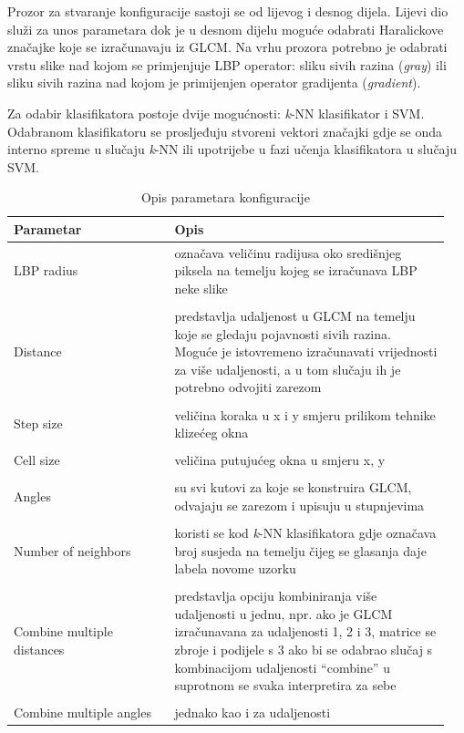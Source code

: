 \documentclass[times, utf8, zavrsni]{fer}
\begin{document}
\bigbreak

Prozor za stvaranje konfiguracije sastoji se od lijevog i desnog dijela. 
Lijevi dio služi za unos parametara dok je u desnom dijelu moguće odabrati
Haralickove značajke koje se izračunavaju iz GLCM. Na vrhu prozora potrebno
je odabrati vrstu slike nad kojom se primjenjuje LBP operator: sliku 
sivih razina (\textit{gray}) ili sliku sivih razina nad kojom je 
primijenjen operator gradijenta (\textit{gradient}). 

\bigbreak

Za odabir klasifikatora postoje dvije mogućnosti: \textit{k}-NN klasifikator i 
SVM. Odabranom klasifikatoru se prosljeđuju stvoreni vektori značajki gdje se onda
interno spreme u slučaju \textit{k}-NN ili upotrijebe u fazi učenja klasifikatora
u slučaju SVM. 

\begin{table}
\begin{tabular}{p{0.35\linewidth} | p{0.6\linewidth}}
Parametar & Opis \\
\hline
LBP radius & označava veličinu radijusa oko središnjeg piksela
na temelju kojeg se izračunava LBP neke slike \\

\\
\hline
Distance & predstavlja udaljenost u GLCM na temelju koje 
se gledaju pojavnosti sivih razina. Moguće je istovremeno izračunavati vrijednosti
za više udaljenosti, a u tom slučaju ih je potrebno odvojiti zarezom \\

\\
\hline
Step size & veličina koraka u x i y smjeru prilikom tehnike klizećeg okna \\

\\
\hline
Cell size & veličina putujućeg okna u smjeru x, y \\

\\
\hline
Angles & su svi kutovi za koje se konstruira GLCM, odvajaju
se zarezom i upisuju u stupnjevima \\

\\
\hline
Number of neighbors & koristi se kod \textit{k}-NN klasifikatora
gdje označava broj susjeda na temelju čijeg se glasanja daje labela novome uzorku \\

\\
\hline
Combine multiple distances & predstavlja opciju kombiniranja više
udaljenosti u jednu, npr. ako je GLCM izračunavana za udaljenosti 1, 2 i 3, matrice
se zbroje i podijele s 3 ako bi se odabrao slučaj s kombinacijom udaljenosti \enquote{combine}
u suprotnom se svaka interpretira za sebe \\

\\
\hline
Combine multiple angles & jednako kao i za udaljenosti

\end{tabular}
\caption{Opis parametara konfiguracije}
\end{table}
\end{document}
